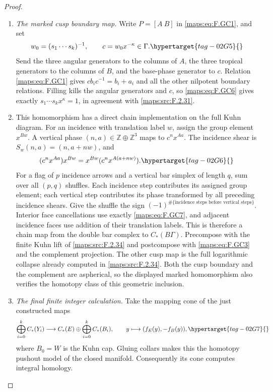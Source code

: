 \documentclass[11pt,a4paper]{article}
\numberwithin{equation}{section}
\theoremstyle{definition}
\begin{document}
\begin{proof}
\begin{enumerate}[label=\arabic*.]
\item \emph{The marked cusp boundary map.}
Write $P=[A\ B]$ in \eqref{maps:eq:F.GC1}, and set
\begin{equation}
 w_0=(s_1\cdots s_k)^{-1},\qquad
 c=w_0x^{-\kappa}\in\Gamma.
                                                               \hypertarget{tag-02G5}{}\label{maps:eq:F.GC6}
\end{equation}
Send the three angular generators to the columns of $A$,
the three tropical generators to the columns of $B$, and
the base-phase generator to $c$.  Relation \eqref{maps:eq:F.GC1} gives
$c b_i c^{-1}=b_i+a_i$ and all the other nilpotent boundary
relations.  Filling kills the angular generators and $c$,
so \eqref{maps:eq:F.GC6} gives exactly
$s_1\cdots s_kx^\kappa=1$, in agreement with \ref{maps:src:F.2.31}.

\item This homomorphism has a direct chain implementation on the
full Kuhn diagram.  For an incidence with translation label
$w$, assign the group element $x^{Bw}$.  A vertical phase
$(n,a)\in\mathbb Z\oplus\mathbb Z^3$ maps to $c^nx^{Aa}$.
The incidence shear is $S_w(n,a)=(n,a+n w)$, and
\begin{equation}
 (c^nx^{Aa})x^{Bw}=x^{Bw}(c^nx^{A(a+n w)}).                \hypertarget{tag-02G6}{}\label{maps:eq:F.GC7}
\end{equation}
For a flag of $p$ incidence arrows and a vertical bar
simplex of length $q$, sum over all $(p,q)$ shuffles.
Each incidence step contributes its assigned group element;
each vertical step contributes its phase transformed by
all preceding incidence shears.  Give the shuffle the sign
$(-1)^{\#\{\text{incidence steps before vertical steps}\}}$.
Interior face cancellations use exactly \eqref{maps:eq:F.GC7}, and adjacent
incidence faces use addition of their translation labels.
This is therefore a chain map from the double bar complex
to $C_*(B\Gamma)$.  Precompose with the finite Kuhn lift of
\ref{maps:src:F.2.34} and postcompose with \eqref{maps:eq:F.GC3} and the complement
projection.  The other cusp map is the full logarithmic
collapse already computed in \ref{maps:src:F.2.34}.
Both the cusp boundary and the complement are aspherical,
so the displayed marked homomorphism also verifies the
homotopy class of this geometric inclusion.

\item \emph{The final finite integer calculation.}
Take the mapping cone of the just constructed maps
\begin{equation}
 \bigoplus_{i=0}^k C_*(Y_i)\longrightarrow
 C_*(E)\oplus\bigoplus_{i=0}^k C_*(B_i),
 \qquad y\longmapsto(f_E(y),-f_B(y)),                     \hypertarget{tag-02G7}{}\label{maps:eq:F.GC8}
\end{equation}
where $B_0=W$ is the Kuhn cap.  Gluing collars makes this
the homotopy pushout model of the closed manifold.
Consequently its cone computes integral homology.


\end{enumerate}
\end{proof}
\end{document}
